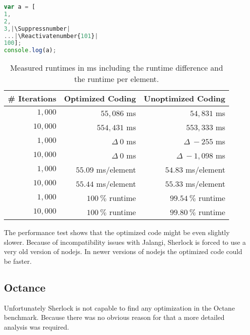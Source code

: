 \begin{lstlisting}[caption=Optimized test coding,label=list:opt_js_test,language=JavaScript]
var a = [
1,
2,
3,|\Suppressnumber|
...|\Reactivatenumber{101}|
100];
console.log(a);
\end{lstlisting}

\begin{table}[h]
\begin{center}
\renewcommand{\thead}[1]{\multicolumn{1}{c}{\bfseries #1}}
\renewcommand{\arraystretch}{1.3}
\begin{tabular}[htbp]{r|r|r}
\thead{\# Iterations} & \thead{Optimized Coding} & \thead{Unoptimized Coding} \\
\hline $1,000$ & $55,086$ ms & $54,831$ ms \\
\hline $10,000$ & $554,431$ ms & $553,333$ ms \\
\hline\hline $1,000$ & $\Delta\ 0$ ms & $\Delta\ -255$ ms \\
\hline $10,000$ & $\Delta\ 0$ ms & $\Delta\ -1,098$ ms \\

\hline\hline $1,000$ & $55.09$ ms/element & $54.83$ ms/element \\
\hline $10,000$ & $55.44$ ms/element & $55.33$ ms/element  \\
\hline\hline $1,000$ & $100\ \%$ runtime & $99.54\ \%$ runtime \\
\hline $10,000$ & $100\ \%$ runtime & $99.80\ \%$ runtime \\ \hline
\end{tabular}
\end{center}
\caption{Measured runtimes in ms including the runtime difference and the runtime per element.}\label{tab:perf_results}
\end{table}

The performance test shows that the optimized code might be even slightly slower. 
Because of incompatibility issues with Jalangi, Sherlock is forced to use a very 
old version of nodejs. In newer versions of nodejs the optimized code could be faster.



\subsection{Octance}

Unfortunately Sherlock is not capable to find any optimization in the Octane benchmark. 
Because there was no obvious reason for that a more detailed analysis was required.

